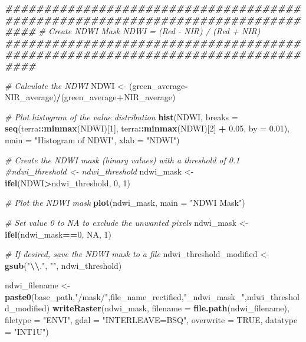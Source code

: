 \documentclass[
]{article}
\newenvironment{Shaded}{\begin{snugshade}}{\end{snugshade}}
\newcommand{\AttributeTok}[1]{\textcolor[rgb]{0.13,0.29,0.53}{#1}}
\newcommand{\CommentTok}[1]{\textcolor[rgb]{0.56,0.35,0.01}{\textit{#1}}}
\newcommand{\ConstantTok}[1]{\textcolor[rgb]{0.56,0.35,0.01}{#1}}
\newcommand{\DecValTok}[1]{\textcolor[rgb]{0.00,0.00,0.81}{#1}}
\newcommand{\DocumentationTok}[1]{\textcolor[rgb]{0.56,0.35,0.01}{\textbf{\textit{#1}}}}
\newcommand{\FloatTok}[1]{\textcolor[rgb]{0.00,0.00,0.81}{#1}}
\newcommand{\FunctionTok}[1]{\textcolor[rgb]{0.13,0.29,0.53}{\textbf{#1}}}
\newcommand{\NormalTok}[1]{#1}
\newcommand{\OtherTok}[1]{\textcolor[rgb]{0.56,0.35,0.01}{#1}}
\newcommand{\SpecialCharTok}[1]{\textcolor[rgb]{0.81,0.36,0.00}{\textbf{#1}}}
\newcommand{\StringTok}[1]{\textcolor[rgb]{0.31,0.60,0.02}{#1}}
\begin{document}
\begin{Shaded}
\begin{Highlighting}[]
\DocumentationTok{\#\#\#\#\#\#\#\#\#\#\#\#\#\#\#\#\#\#\#\#\#\#\#\#\#\#\#\#\#\#\#\#\#\#\#\#\#\#\#\#\#\#\#\#\#\#\#\#\#\#\#\#\#\#\#\#\#\#\#\#\#\#\#\#\#\#\#\#\#\#\#\#\#\#\#\#\#\#\#\#}
\CommentTok{\# Create NDWI Mask NDWI = (Red {-} NIR) / (Red + NIR)}
\DocumentationTok{\#\#\#\#\#\#\#\#\#\#\#\#\#\#\#\#\#\#\#\#\#\#\#\#\#\#\#\#\#\#\#\#\#\#\#\#\#\#\#\#\#\#\#\#\#\#\#\#\#\#\#\#\#\#\#\#\#\#\#\#\#\#\#\#\#\#\#\#\#\#\#\#\#\#\#\#\#\#\#\#}

\CommentTok{\# Calculate the NDWI}
\NormalTok{NDWI }\OtherTok{\textless{}{-}}\NormalTok{ (green\_average}\SpecialCharTok{{-}}\NormalTok{NIR\_average)}\SpecialCharTok{/}\NormalTok{(green\_average}\SpecialCharTok{+}\NormalTok{NIR\_average)}

\CommentTok{\# Plot histogram of the value distribution}
\FunctionTok{hist}\NormalTok{(NDWI, }\AttributeTok{breaks =} \FunctionTok{seq}\NormalTok{(terra}\SpecialCharTok{::}\FunctionTok{minmax}\NormalTok{(NDWI)[}\DecValTok{1}\NormalTok{], terra}\SpecialCharTok{::}\FunctionTok{minmax}\NormalTok{(NDWI)[}\DecValTok{2}\NormalTok{] }\SpecialCharTok{+} \FloatTok{0.05}\NormalTok{, }\AttributeTok{by =} \FloatTok{0.01}\NormalTok{),}
     \AttributeTok{main =} \StringTok{"Histogram of NDWI"}\NormalTok{, }\AttributeTok{xlab =} \StringTok{"NDWI"}\NormalTok{)}

\CommentTok{\# Create the NDWI mask (binary values) with a threshold of 0.1}
\CommentTok{\#ndwi\_threshold \textless{}{-} ndwi\_threshold}
\NormalTok{ndwi\_mask }\OtherTok{\textless{}{-}} \FunctionTok{ifel}\NormalTok{(NDWI}\SpecialCharTok{\textgreater{}}\NormalTok{ndwi\_threshold, }\DecValTok{0}\NormalTok{, }\DecValTok{1}\NormalTok{)}

\CommentTok{\# Plot the NDWI mask}
\FunctionTok{plot}\NormalTok{(ndwi\_mask, }\AttributeTok{main =} \StringTok{"NDWI Mask"}\NormalTok{)}

\CommentTok{\# Set value 0 to NA to exclude the unwanted pixels}
\NormalTok{ndwi\_mask }\OtherTok{\textless{}{-}} \FunctionTok{ifel}\NormalTok{(ndwi\_mask}\SpecialCharTok{==}\DecValTok{0}\NormalTok{, }\ConstantTok{NA}\NormalTok{, }\DecValTok{1}\NormalTok{)}

\CommentTok{\# If desired, save the NDWI mask to a file}
\NormalTok{ndwi\_threshold\_modified }\OtherTok{\textless{}{-}} \FunctionTok{gsub}\NormalTok{(}\StringTok{"}\SpecialCharTok{\textbackslash{}\textbackslash{}}\StringTok{."}\NormalTok{, }\StringTok{""}\NormalTok{, ndwi\_threshold)}

\NormalTok{ndwi\_filename }\OtherTok{\textless{}{-}} \FunctionTok{paste0}\NormalTok{(base\_path,}\StringTok{"/mask/"}\NormalTok{,file\_name\_rectified,}\StringTok{"\_ndwi\_mask\_"}\NormalTok{,ndwi\_threshold\_modified)}
\FunctionTok{writeRaster}\NormalTok{(ndwi\_mask, }\AttributeTok{filename =} \FunctionTok{file.path}\NormalTok{(ndwi\_filename),}
            \AttributeTok{filetype =} \StringTok{"ENVI"}\NormalTok{,}
            \AttributeTok{gdal =} \StringTok{"INTERLEAVE=BSQ"}\NormalTok{,}
            \AttributeTok{overwrite =} \ConstantTok{TRUE}\NormalTok{,}
            \AttributeTok{datatype =} \StringTok{"INT1U"}\NormalTok{)}


\end{Highlighting}
\end{Shaded}
\end{document}
